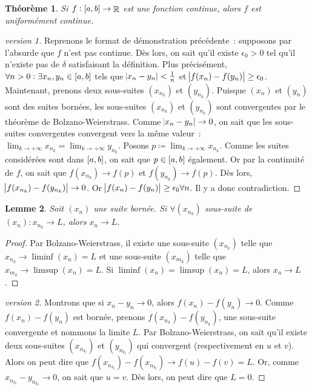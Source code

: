 \documentclass{article}
\DeclareMathOperator{\R}{\mathbb R}
\newcommand{\ab}{\interval ab}
\newcommand{\fabr}[1]{#1 : \ab \to \R}
\newtheorem{thm}{Théorème}[section]
\newtheorem{lem}[thm]{Lemme}
\theoremstyle{definition}
\theoremstyle{remark}
\begin{document}
		\begin{thm} Si $\fabr f$ est une fonction continue, alors $f$ est uniformément continue. \end{thm}

		\begin{proof}[version 1] Reprenons le format de démonstration précédente~: supposons par l'absurde que $f$ n'est pas continue. Dès lors, on sait qu'il
		existe $\epsilon_0 > 0$ tel qu'il n'existe pas de $\delta$ satisfaisant la définition. Plus précisément, $\forall n > 0 : \exists x_n, y_n \in \ab$
		tels que $\abs{x_n-y_n} < \frac 1n$ et $\abs{f(x_n) - f(y_n)} \geq \epsilon_0$. Maintenant, prenons deux sous-suites $(x_{n_k})$ et $(y_{n_k})$. Puisque
		$(x_n)$ et $(y_n)$ sont des suites bornées, les sous-suites $(x_{n_k})$ et $(y_{n_k})$ sont convergentes par le théorème de Bolzano-Weierstrass. Comme
		$\abs{x_n-y_n} \to 0$, on sait que les sous-suites convergentes convergent vers la même valeur~: $\lim_{k\to+\infty}x_{n_k} = \lim_{k\to+\infty}y_{n_k}$.
		Posons $p \coloneqq \lim_{k\to+\infty}x_{n_k}$. Comme les suites considérées sont dans $\ab$, on sait que $p \in \ab$
		également. Or par la continuité de $f$, on sait que $f(x_{n_k}) \to f(p)$ et $f(y_{n_k}) \to f(p)$. Dès lors, $\abs{f(x_{n_k})-f(y_{n_k})} \to 0$.
		Or $\abs{f(x_n) - f(y_n)} \geq \epsilon_0 \forall n$. Il y a donc contradiction. \end{proof}

		\begin{lem} Soit $(x_n)$ une suite bornée. Si $\forall (x_{n_k})$ sous-suite de $(x_n) : x_{n_k} \to L$, alors $x_n \to L$. \end{lem}

		\begin{proof} Par Bolzano-Weierstrass, il existe une sous-suite $(x_{n_k})$ telle que $x_{n_k} \to \liminf (x_n) = L$ et une
		sous-suite $(x_{m_k})$ telle que $x_{m_k} \to \limsup (x_n) = L$. Si $\liminf(x_n) = \limsup (x_n) = L$, alors $x_n \to L$. \end{proof}

		\begin{proof}[version 2] Montrons que si $x_n - y_n \to 0$, alors $f(x_n) - f(y_n) \to 0$. Comme $f(x_n)-f(y_n)$ est bornée, prenons
		$f(x_{n_k})-f(y_{n_k})$, une sous-suite convergente et nommons la limite $L$. Par Bolzano-Weierstrass, on sait qu'il existe deux sous-suites
		$(x_{n_{k_l}})$ et $(y_{n_{k_l}})$ qui convergent (respectivement en $u$ et $v$). Alors on peut dire que $f(x_{n_{k_l}}) - f(x_{n_{k_l}}) \to f(u) - f(v) = L$.
		Or, comme $x_{n_{k_l}} - y_{n_{k_l}} \to 0$, on sait que $u = v$. Dès lors, on peut dire que $L = 0$. \end{proof}
\end{document}
